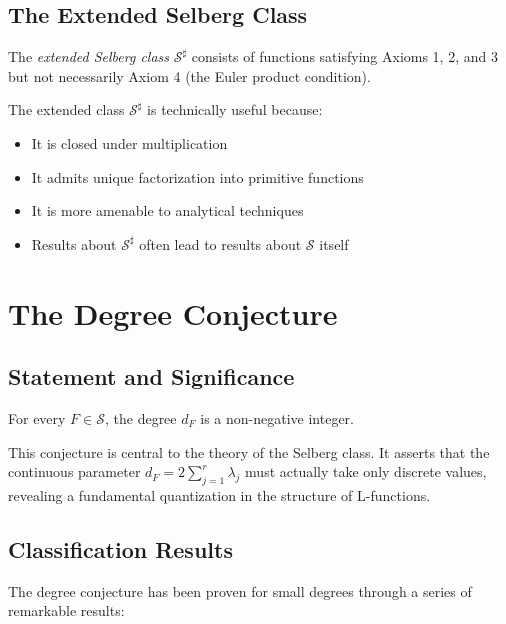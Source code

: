 \subsection{The Extended Selberg Class}

\begin{definition}
The \emph{extended Selberg class} $\mathcal{S}^{\sharp}$ consists of functions satisfying Axioms 1, 2, and 3 but not necessarily Axiom 4 (the Euler product condition).
\end{definition}

The extended class $\mathcal{S}^{\sharp}$ is technically useful because:
\begin{itemize}
\item It is closed under multiplication
\item It admits unique factorization into primitive functions
\item It is more amenable to analytical techniques
\item Results about $\mathcal{S}^{\sharp}$ often lead to results about $\mathcal{S}$ itself
\end{itemize}

\section{The Degree Conjecture}
\label{sec:degree-conjecture}

\subsection{Statement and Significance}

\begin{conjecture}
For every $F \in \mathcal{S}$, the degree $d_F$ is a non-negative integer.
\end{conjecture}

This conjecture is central to the theory of the Selberg class. It asserts that the continuous parameter $d_F = 2\sum_{j=1}^r \lambda_j$ must actually take only discrete values, revealing a fundamental quantization in the structure of L-functions.

\subsection{Classification Results}

The degree conjecture has been proven for small degrees through a series of remarkable results:

